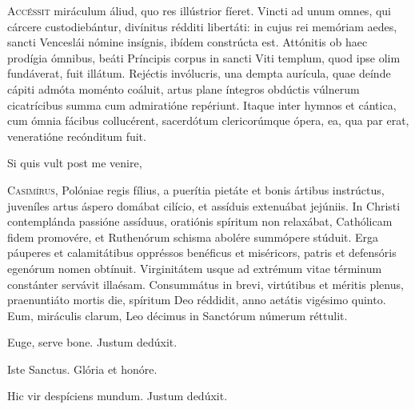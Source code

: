 
\lettrine{A}{ccéssit} miráculum áliud, quo res illústrior fíeret.
Vincti ad unum omnes, qui cárcere custodiebántur,
divínitus rédditi libertáti: in cujus rei memóriam aedes,
sancti Venceslái nómine insígnis, ibídem constrúcta est.
Attónitis ob haec prodígia ómnibus, beáti Príncipis corpus
in sancti Viti templum, quod ipse olim fundáverat,
fuit illátum. Rejéctis invólucris, una dempta aurícula,
quae deínde cápiti admóta moménto coáluit,
artus plane íntegros obdúctis vúlnerum cicatrícibus
summa cum admiratióne repériunt.
Itaque inter hymnos et cántica, cum ómnia fácibus collucérent,
sacerdótum clericorúmque ópera, ea, qua par erat,
veneratióne recónditum fuit.

Si quis vult post me venire,



\lettrine{C}{asimírus,} Polóniae regis fílius, a puerítia pietáte et bonis ártibus
instrúctus, juveníles artus áspero domábat cilício,
et assíduis extenuábat jejúniis.
In Christi contemplánda passióne assíduus,
oratiónis spíritum non relaxábat,
Cathólicam fidem promovére,
et Ruthenórum schisma abolére summópere stúduit.
Erga páuperes et calamitátibus oppréssos benéficus et miséricors,
patris et defensóris egenórum nomen obtínuit.
Virginitátem usque ad extrémum vitae términum constánter servávit
illaésam.
Consummátus in brevi, virtútibus et méritis plenus,
praenuntiáto mortis die, spíritum Deo réddidit,
anno aetátis vigésimo quinto.
Eum, miráculis clarum, Leo décimus in Sanctórum númerum réttulit.

\parsTeDeum

Euge, serve bone.
Justum dedúxit.

Iste Sanctus.
Glória et honóre.

Hic vir despíciens mundum.
Justum dedúxit.
